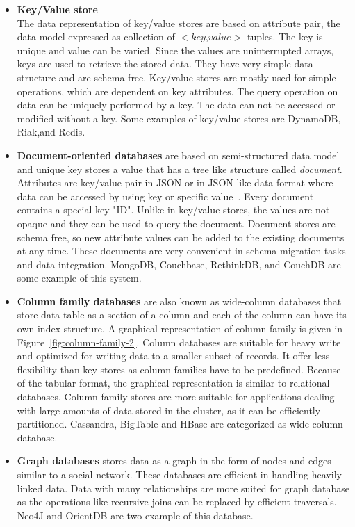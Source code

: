 	\begin{itemize}
		\item 
			\textbf{Key/Value store}\\ The data representation of key/value stores are based on attribute pair, the data model expressed as collection of $<$$key$,$value$$>$ tuples. The key is unique and value can be varied. Since the values are uninterrupted arrays, keys are used to retrieve the stored data. They have very simple data structure and are schema free. Key/value stores are mostly used for simple operations, which are dependent on key attributes. The query operation on data can be uniquely performed by a key. The data can not be accessed or modified without a key. Some examples of key/value stores are DynamoDB, Riak,and Redis.
		\item 
			\textbf{Document-oriented databases} are based on semi-structured data model and unique key stores a value that has a tree like structure called \textit{document}. Attributes are key/value pair in JSON or in JSON like data format where data can be accessed by using key or specific value~\citep{hecht2011nosql}. Every document contains a special key "ID". Unlike in key/value stores, the values are not opaque and  they can be used to query the document. Document stores are schema free, so new attribute values can be added to the existing documents at any time. These documents are very convenient in schema migration tasks and data integration.  MongoDB, Couchbase, RethinkDB, and CouchDB are some example of this system.
		\item 
			\textbf{Column family databases} are also known as wide-column databases that store data table as a section of a column and each of the column can have  its own index structure. A graphical representation of column-family is given in  Figure~\ref{fig:column-family-2}. Column databases are suitable for heavy write and optimized for writing data to a smaller subset of records. It offer less flexibility than key stores as column families have to be predefined. Because of the tabular format, the graphical representation is similar to relational databases. Column family stores are more suitable for applications dealing with large amounts of data stored in the cluster, as it can be efficiently partitioned.  Cassandra, BigTable and HBase are categorized as wide column database.
		\item 
			\textbf{Graph databases} stores data as a  graph in the form of nodes and edges similar to a social network. These databases are efficient in handling heavily linked data. Data with many relationships are more suited for graph database as the operations like recursive joins can be replaced by efficient traversals. Neo4J and OrientDB are two example of this database.
	\end{itemize}
	

